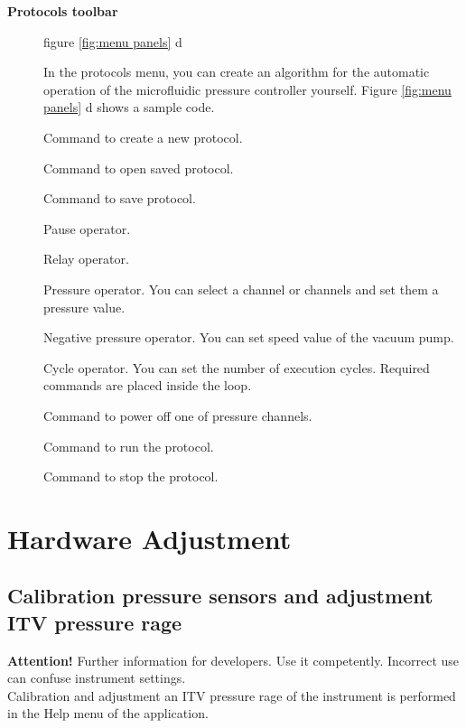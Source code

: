 \documentclass[twoside, 12pt, a4paper]{refart}
\begin{document}
\begin{description}
    \item[\textbf{Protocols toolbar}] figure \ref{fig:menu panels} d
      
      In the protocols menu, you can create an algorithm for the automatic operation of the microfluidic pressure controller yourself. Figure \ref{fig:menu panels} d shows a sample code.
      
       Command to create a new protocol.
      
       Command to open saved protocol.  
      
       Command to save protocol.  
      
       Pause operator. 
       
       Relay operator. 
       
       Pressure operator. You can select a channel or channels and set them a pressure value.  
      
       Negative pressure operator. You can set speed value of the vacuum pump.  
      
       Cycle operator. You can set the number of execution cycles. Required commands are placed inside the loop.  
      
       Command to power off one of pressure channels.  
      
       Command to run the protocol. 
      
       Command to stop the protocol.  

     
    \end{description}     
  
  \newpage
  \section{Hardware Adjustment}
  \label{Hardware-Adjustment}
  \subsection{Calibration pressure sensors and adjustment ITV pressure rage}
    
    \textbf{Attention!} Further information for developers. Use it competently. Incorrect use can confuse instrument settings.\\
    Calibration and adjustment an ITV pressure rage of the instrument is performed in the Help menu of the application.\\
    
\end{document}
